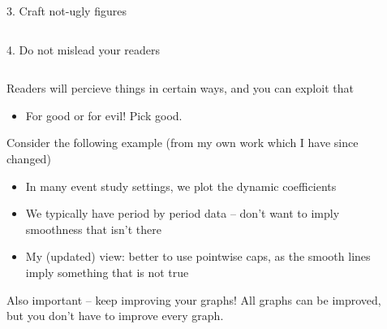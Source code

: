 \documentclass[notes,11pt, aspectratio=169]{beamer}
\newenvironment{wideitemize}{\itemize\addtolength{\itemsep}{10pt}}{\enditemize}
\begin{document}
\begin{frame}{3. Craft not-ugly figures}
\begin{columns}[T]
\begin{column}{.4\textwidth}
  \end{column}
\end{columns}
\end{frame}

\begin{frame}{4. Do not mislead your readers}
  \begin{columns}[T] %
    \begin{column}{.7\textwidth}
      \begin{wideitemize}
      \item Readers will percieve things in certain ways, and you can exploit that
        \begin{itemize}
        \item For good or for evil! Pick good.
        \end{itemize}
      \item Consider the following example (from my own work which I have since changed)
        \begin{itemize}
        \item In many event study settings, we plot the dynamic coefficients
        \item We typically have period by period data -- don't want to
          imply smoothness that isn't there
        \item My (updated) view: better to use pointwise caps, as the
          smooth lines imply something that is not true
        \end{itemize}
      \item Also important -- keep improving your graphs! All graphs
        can be improved, but you don't have to improve every graph.
      \end{wideitemize}
  \end{column}%
  \hfill%
  \begin{column}{.4\textwidth}
  \end{column}
\end{columns}
\end{frame}
\end{document}
